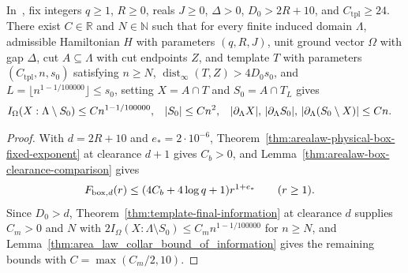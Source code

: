 \begin{lemma}
    \label{thm:area_law_sublinear_collar}
    \leanok
    In~\cite[Proposition~9.6]{OpenAI2026AreaLaw}, fix integers $q\geq1$,
    $R\ge0$, reals $J\geq0$, $\Delta>0$, $D_0>2R+10$, and
    $C_{\mathrm{tpl}}\geq24$. There exist $C\in\mathbb R$ and $N\in\mathbb N$
    such that for every finite induced domain $\Lambda$, admissible Hamiltonian
    $H$ with parameters $(q,R,J)$, unit ground vector $\Omega$ with gap
    $\Delta$, cut $A\subseteq\Lambda$ with cut endpoints $Z$, and template $T$
    with parameters $(C_{\mathrm{tpl}},n,s_0)$ satisfying $n\geq N$,
    $\operatorname{dist}_\infty(T,Z)>4D_0s_0$, and
    $L=\lfloor n^{1-1/100000}\rfloor\leq s_0$, setting $X=A\cap T$ and
    $S_0=A\cap T_L$ gives
    \begin{align}
        I_\Omega(X:\Lambda\setminus S_0)                                                   & \leq Cn^{1-1/100000}, &
        |S_0|                                                                              & \leq Cn^2,            &
        |\partial_\Lambda X|,\,|\partial_\Lambda S_0|,\,|\partial_\Lambda(S_0\setminus X)| & \le Cn.\notag
    \end{align}
\end{lemma}
\begin{proof}\leanok
    With $d=2R+10$ and $e_*=2\cdot10^{-6}$,
    Theorem~\ref{thm:arealaw-physical-box-fixed-exponent} at clearance $d+1$
    gives $C_b>0$, and Lemma~\ref{thm:arealaw-box-clearance-comparison} gives
    \begin{align}
        F_{\mathrm{box},d}(r)
         & \leq (4C_b+4\log q+1)r^{1+e_*}\qquad(r\ge1).\notag
    \end{align}
    Since $D_0>d$, Theorem~\ref{thm:template-final-information} at clearance
    $d$ supplies $C_m>0$ and $N$ with
    $2I_\Omega(X:\Lambda\setminus S_0)\leq C_m n^{1-1/100000}$ for $n\ge N$, and
    Lemma~\ref{thm:area_law_collar_bound_of_information} gives the remaining
    bounds with $C=\max(C_m/2,10)$.
\end{proof}

